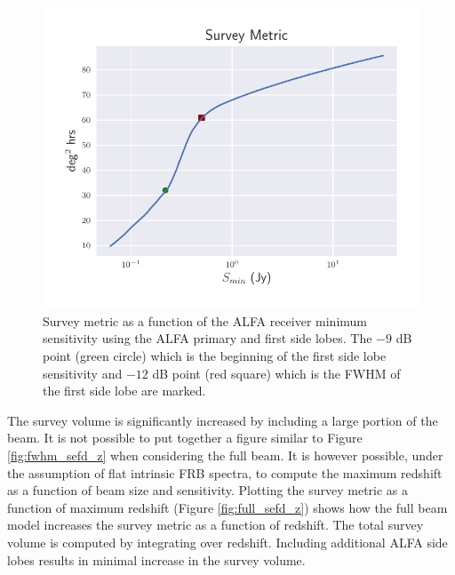 \documentclass[a4paper,fleqn,usenatbib]{mnras}
\begin{document}
\begin{figure}
    \includegraphics[width=1.0\linewidth]{figures/full_survey_metric_sense.pdf}
    \caption{Survey metric as a function of the ALFA receiver minimum
    sensitivity using the ALFA primary and first side lobes. The $-9$ dB point
    (green circle) which is the beginning of the first side lobe sensitivity and
    $-12$ dB point (red square) which is the FWHM of the first side lobe are marked.
    }
    \label{fig:survey_metric_sense}
\end{figure}

The survey volume is significantly increased by including a large
portion of the beam. It is not possible to put together a figure
similar to Figure \ref{fig:fwhm_sefd_z} when considering the full
beam. It is however possible, under the assumption of flat intrinsic
FRB spectra, to compute the maximum redshift as a function of beam
size and sensitivity. Plotting the survey metric as a function of
maximum redshift (Figure \ref{fig:full_sefd_z}) shows how the full
beam model increases the survey metric as a function of redshift. The
total survey volume is computed by integrating over redshift.
Including additional ALFA side lobes results in minimal increase in
the survey volume.
\end{document}
